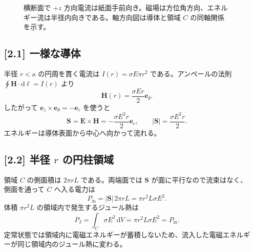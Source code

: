 \documentclass[11pt,a4paper]{article}
\begin{document}
\begin{figure}[htbp]
\caption{横断面で $+z$ 方向電流は紙面手前向き。磁場は方位角方向、エネルギー流は半径内向きである。軸方向図は導体と領域 $C$ の同軸関係を示す。}
\end{figure}

\subsection*{[2.1] 一様な導体}
半径 $r<a$ の円周を貫く電流は $I(r)=\sigma E\pi r^2$ である。アンペールの法則 $\oint\boldsymbol{H}\cdot\mathrm{d}\boldsymbol{\ell}=I(r)$ より
\begin{equation}
  \boldsymbol{H}(r)=\frac{\sigma Er}{2}\boldsymbol{e}_\theta.
\end{equation}
したがって $\boldsymbol{e}_z\times\boldsymbol{e}_\theta=-\boldsymbol{e}_r$ を使うと
\begin{equation}
  \boxed{\boldsymbol{S}=\boldsymbol{E}\times\boldsymbol{H}
  =-\frac{\sigma E^2r}{2}\boldsymbol{e}_r,\qquad
  |\boldsymbol{S}|=\frac{\sigma E^2r}{2}.}
\end{equation}
エネルギーは導体表面から中心へ向かって流れる。

\subsection*{[2.2] 半径 $r$ の円柱領域}
領域 $C$ の側面積は $2\pi rL$ である。両端面では $\boldsymbol{S}$ が面に平行なので流束はなく、側面を通って $C$ へ入る電力は
\begin{equation}
  P_{\mathrm{in}}=|\boldsymbol{S}|\,2\pi rL
  =\pi r^2L\sigma E^2.
\end{equation}
体積 $\pi r^2L$ の領域内で発生するジュール熱は
\begin{equation}
  P_{\mathrm{J}}=\int_C\sigma E^2\,\mathrm{d}V
  =\pi r^2L\sigma E^2=P_{\mathrm{in}}.
\end{equation}
定常状態では領域内に電磁エネルギーが蓄積しないため、流入した電磁エネルギーが同じ領域内のジュール熱に変わる。
\end{document}
